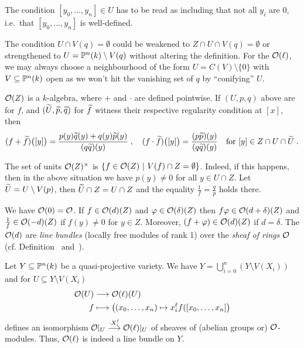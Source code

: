 \documentclass[a4paper,parskip=half,numbers=enddot, DIV=12]{scrreprt}
\begin{document}
\begin{rem}
    \begin{alphanumerate}
        \item {}
            The condition $[y_0,\ldots, y_n]\in U$ has to be read as including that not all $y_i$ are $0$, i.e.\ that $[y_0,\ldots, y_n]$ is well-defined.
        \item 
            The condition $U\cap V(q) = \emptyset$ could be weakened to $Z\cap U\cap V(q) = \emptyset$ or strengthened to $U=\mathbb{P}^n(k)\setminus V(q)$ without altering the definition. For the $\mathcal{O}(\ell)$, we may always choose a neighbourhood of the form $U=C(V)\setminus\{0\}$ with $V\subseteq \mathbb{P}^n(k)$ open as we won't hit the vanishing set of $q$ by ``conifying'' $U$.
        \item 
            $\mathcal{O}(Z)$ is a $k$-algebra, where $+$ and $\cdot$ are defined pointwise. If $(U,p,q)$ above are for $f$, and $(\snake U, \snake p, \snake q)$ for $\snake f$ witness their respective regularity condition at $[x]$, then
            \begin{align*}
                (f+\snake f)\big([y]\big) = \frac{p(y)\snake q(y) + q(y)\snake p(y)}{(q\snake q)(y)}\;,\quad
                (f\cdot\snake f)\big([y]\big) = \frac{(p\snake p)(y)}{(q\snake q)(y)}\quad\text{for }[y]\in Z\cap U\cap\snake U\;.
            \end{align*}
        \item 
            The set of units $\mathcal{O}(Z)^\times$ is $\left\{f\in \mathcal{O}(Z)\ \middle|\  V(f)\cap Z = \emptyset\right\}$. Indeed, if this happens, then in the above situation we have $p(y)\neq0$ for all $y\in U\cap Z$. Let $\snake U = U\setminus V(p)$, then $\snake U \cap Z = U\cap Z$ and the equality $\frac{1}{f} = \frac{q}{p}$ holds there.
        \item We have $\mathcal{O}(0)=\mathcal{O}$. If $f\in \mathcal{O}(d)(Z)$ and $\varphi\in\mathcal{O}(\delta)(Z)$ then $f\varphi \in \mathcal{O}(d+\delta)(Z)$ and $\frac{1}{f}\in \mathcal{O}(-d)(Z)$ if $f(y) \neq 0$ for $y\in Z$. Moreover, $(f+\varphi)\in \mathcal{O}(d)(Z)$ if $d=\delta$. The $\mathcal{O}(d)$ are \emph{line bundles} (locally free modules of rank 1) over the \emph{sheaf of rings} $\mathcal{O}$ (cf. Definition~ and~).
    \end{alphanumerate}
\end{rem}
\begin{example}
    Let $Y\subseteq \mathbb{P}^n(k)$ be a quasi-projective variety. We have $Y = \bigcup_{i=0}^n (Y\setminus V(X_i))$ and for $U\subseteq Y\setminus V(X_i)$
    \begin{align*}
        \Oo(U) &\morphism \Oo(\ell)(U)\\
        f&\longmapsto \big((x_0,\ldots, x_n) \mapsto x_i^\ell f([x_0,\ldots, x_n]\big)
    \end{align*}
    defines an isomorphism $\Oo|_U \morphism[\cdot X_i^\ell] \Oo(\ell)|_U$ of sheaves of (abelian groups or) $\mathcal{O}$-modules. Thus, $\mathcal{O}(\ell)$ is indeed a line bundle on $Y$. 
\end{example}
\end{document}
